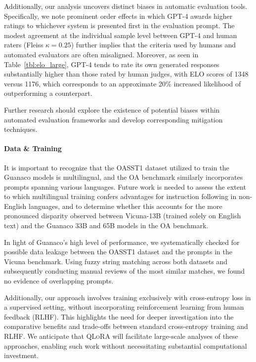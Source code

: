 Additionally, our analysis uncovers distinct biases in automatic evaluation tools. Specifically, we note prominent order effects in which GPT-4 awards higher ratings to whichever system is presented first in the evaluation prompt. The modest agreement at the individual sample level between GPT-4 and human raters (Fleiss $\kappa=0.25$) further implies that the criteria used by humans and automated evaluators are often misaligned. Moreover, as seen in Table~\ref{tbl:elo_large}, GPT-4 tends to rate its own generated responses substantially higher than those rated by human judges, with ELO scores of 1348 versus 1176, which corresponds to an approximate 20\% increased likelihood of outperforming a counterpart.

Further research should explore the existence of potential biases within automated evaluation frameworks and develop corresponding mitigation techniques.

\paragraph{Data \& Training} It is important to recognize that the OASST1 dataset utilized to train the {Guanaco} models is multilingual, and the OA benchmark similarly incorporates prompts spanning various languages. Future work is needed to assess the extent to which multilingual training confers advantages for instruction following in non-English languages, and to determine whether this accounts for the more pronounced disparity observed between Vicuna-13B (trained solely on English text) and the {Guanaco} 33B and 65B models in the OA benchmark.

In light of {Guanaco}'s high level of performance, we systematically checked for possible data leakage between the OASST1 dataset and the prompts in the Vicuna benchmark. Using fuzzy string matching across both datasets and subsequently conducting manual reviews of the most similar matches, we found no evidence of overlapping prompts.

Additionally, our approach involves training exclusively with cross-entropy loss in a supervised setting, without incorporating reinforcement learning from human feedback (RLHF). This highlights the need for deeper investigation into the comparative benefits and trade-offs between standard cross-entropy training and RLHF. We anticipate that \textsc{QLoRA} will facilitate large-scale analyses of these approaches, enabling such work without necessitating substantial computational investment.

